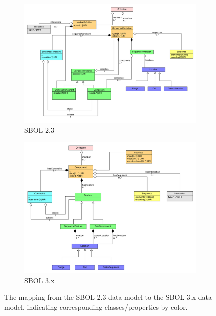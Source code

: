 \begin{figure}[h]
	\begin{subfigure}{.5\textwidth}
		\centering
		\includegraphics[width=\linewidth]{images/sbol_v2_to_v3_left_subfigure}  
		\caption{SBOL 2.3}
		\label{fig:sub-first}
	\end{subfigure}\begin{subfigure}{.5\textwidth}
		\centering
		\includegraphics[width=\linewidth]{images/sbol_v2_to_v3_right_subfigure}  
		\caption{SBOL 3.x}
		\label{fig:sub-second}
	\end{subfigure}
	\caption{\label{SBOL2TO3}The mapping from the SBOL 2.3 data model to the SBOL 3.x  data model, indicating corresponding classes/properties by color.}
\end{figure}


